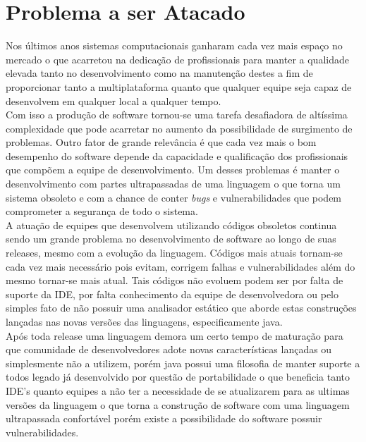 \section{Problema a ser Atacado}

Nos últimos anos sistemas computacionais ganharam cada vez mais espaço no mercado o que acarretou na dedicação de profissionais para manter a qualidade elevada tanto no desenvolvimento como na manutenção destes a fim de proporcionar tanto a multiplataforma quanto que qualquer equipe seja capaz de desenvolvem em qualquer local a qualquer tempo.\\

Com isso a produção de software tornou-se uma tarefa desafiadora de altíssima complexidade que pode acarretar no aumento da possibilidade de surgimento de problemas. Outro fator de grande relevância é que cada vez mais o bom desempenho do software depende da capacidade e qualificação dos profissionais que compõem a equipe de desenvolvimento. Um desses problemas é manter o desenvolvimento com partes ultrapassadas de uma linguagem o que torna um sistema obsoleto e com a chance de conter {\it bugs} e vulnerabilidades que podem comprometer a segurança de todo o sistema.\\


A atuação de equipes que desenvolvem utilizando códigos obsoletos continua sendo um grande problema no desenvolvimento de software ao longo de suas releases, mesmo com a evolução da linguagem. Códigos mais atuais tornam-se cada vez mais necessário pois evitam, corrigem falhas e vulnerabilidades além do mesmo tornar-se mais atual. Tais códigos não evoluem podem ser por falta de suporte da IDE, por falta conhecimento da equipe de desenvolvedora ou pelo simples fato de não possuir uma analisador estático que aborde estas construções lançadas nas novas versões das linguagens, especificamente java.\\


Após toda release uma linguagem demora um certo tempo de maturação para que comunidade de desenvolvedores adote novas características lançadas ou simplesmente não a utilizem, porém java possui uma filosofia de manter suporte a todos legado já desenvolvido por questão de portabilidade o que beneficia tanto IDE's quanto equipes a não ter a necessidade de se atualizarem para as ultimas versões da linguagem o que torna a construção de software com uma linguagem ultrapassada confortável porém existe a possibilidade do software possuir vulnerabilidades.\\

